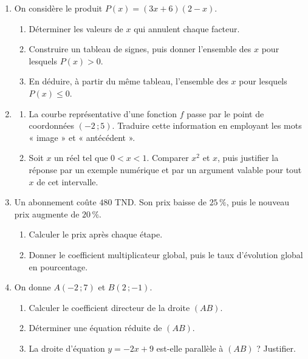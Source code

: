\documentclass[10pt,a4paper]{article}
\begin{document}
\begin{enumerate}
\needspace{22mm}
\item[\textbf{B1.}] On considère le produit $P(x) = (3x + 6)(2 - x)$.
\begin{enumerate}
\item Déterminer les valeurs de $x$ qui annulent chaque facteur.
\item Construire un tableau de signes, puis donner l'ensemble des $x$ pour lesquels $P(x) > 0$.
\item En déduire, à partir du même tableau, l'ensemble des $x$ pour lesquels $P(x) \leqslant 0$.
\end{enumerate}
\par\vspace{1.2mm}
\needspace{22mm}
\item[\textbf{B2.}] \begin{enumerate}
\item La courbe représentative d'une fonction $f$ passe par le point de coordonnées $(-2\,;5)$.
Traduire cette information en employant les mots « image » et « antécédent ».
\item Soit $x$ un réel tel que $0 < x < 1$. Comparer $x^2$ et $x$, puis justifier la réponse
par un exemple numérique et par un argument valable pour tout $x$ de cet intervalle.
\end{enumerate}
\par\vspace{1.2mm}
\needspace{22mm}
\item[\textbf{B3.}] Un abonnement coûte $480$ TND. Son prix baisse de $25\,\%$, puis le nouveau prix
augmente de $20\,\%$.
\begin{enumerate}
\item Calculer le prix après chaque étape.
\item Donner le coefficient multiplicateur global, puis le taux d'évolution global en pourcentage.
\end{enumerate}
\par\vspace{1.2mm}
\needspace{22mm}
\item[\textbf{B4.}] On donne $A(-2\,;7)$ et $B(2\,;-1)$.
\begin{enumerate}
\item Calculer le coefficient directeur de la droite $(AB)$.
\item Déterminer une équation réduite de $(AB)$.
\item La droite d'équation $y = -2x + 9$ est-elle parallèle à $(AB)$ ? Justifier.
\end{enumerate}
\par\vspace{1.2mm}
\end{enumerate}
\end{document}
